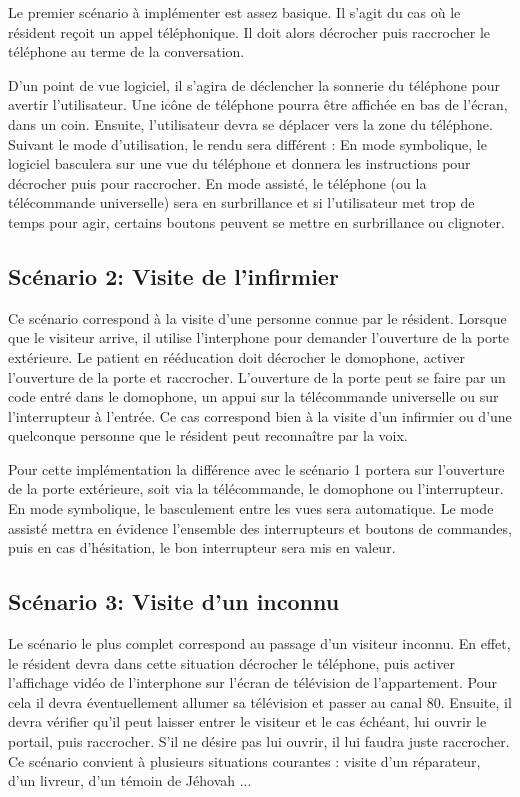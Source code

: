 Le premier scénario à implémenter est assez basique. Il s'agit du cas où le résident reçoit un appel téléphonique. Il doit alors décrocher puis raccrocher le téléphone au terme de la conversation.

D'un point de vue logiciel, il s'agira de déclencher la sonnerie du téléphone pour avertir l'utilisateur. Une icône de téléphone pourra être affichée en bas de l'écran, dans un coin. Ensuite, l'utilisateur devra se déplacer vers la zone du téléphone. Suivant le mode d'utilisation, le rendu sera différent : En mode symbolique, le logiciel basculera sur une vue du téléphone et donnera les instructions pour décrocher puis pour raccrocher. En mode assisté, le téléphone (ou la télécommande universelle) sera en surbrillance et si l'utilisateur met trop de temps pour agir, certains boutons peuvent se mettre en surbrillance ou clignoter.

\subsection{Scénario 2: Visite de l'infirmier}

Ce scénario correspond à la visite d'une personne connue par le résident. Lorsque que le visiteur arrive, il utilise l'interphone pour demander l'ouverture de la porte extérieure. Le patient en rééducation doit décrocher le domophone, activer l'ouverture de la porte et raccrocher. L'ouverture de la porte peut se faire par un code entré dans le domophone, un appui sur la télécommande universelle ou sur l'interrupteur à l'entrée. Ce cas correspond bien à la visite d'un infirmier ou d'une quelconque personne que le résident peut reconnaître par la voix.

Pour cette implémentation la différence avec le scénario 1 portera sur l'ouverture de la porte extérieure, soit via la télécommande, le domophone ou l'interrupteur. En mode symbolique, le basculement entre les vues sera automatique. Le mode assisté mettra en évidence l'ensemble des interrupteurs et boutons de commandes, puis en cas d'hésitation, le bon interrupteur sera mis en valeur.

\subsection{Scénario 3: Visite d'un inconnu}

Le scénario le plus complet correspond au passage d'un visiteur inconnu. En effet, le résident devra dans cette situation décrocher le téléphone, puis activer l'affichage vidéo de l'interphone sur l'écran de télévision de l'appartement. Pour cela il devra éventuellement allumer sa télévision et passer au canal 80. Ensuite, il devra vérifier qu'il peut laisser entrer le visiteur et le cas échéant, lui ouvrir le portail, puis raccrocher. S'il ne désire pas lui ouvrir, il lui faudra juste raccrocher.
Ce scénario convient à plusieurs situations courantes : visite d'un réparateur, d'un livreur, d'un témoin de Jéhovah ...

